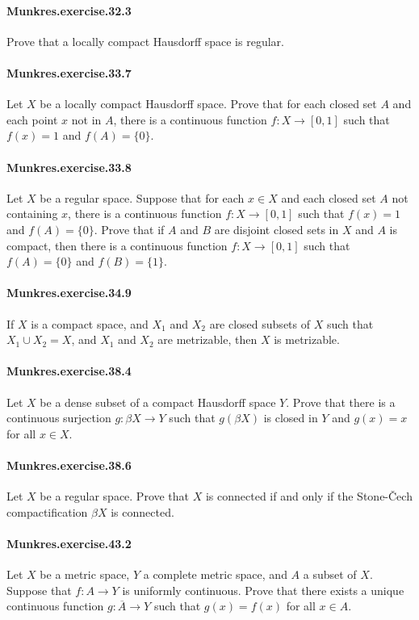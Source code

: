 \documentclass{article}
\begin{document}
\paragraph{Munkres.exercise.32.3} Prove that a locally compact Hausdorff space is regular.

\paragraph{Munkres.exercise.33.7} Let $X$ be a locally compact Hausdorff space. Prove that for each closed set $A$ and each point $x$ not in $A$, there is a continuous function $f:X\to [0,1]$ such that $f(x)=1$ and $f(A)=\{0\}$.

\paragraph{Munkres.exercise.33.8} Let $X$ be a regular space. Suppose that for each $x\in X$ and each closed set $A$ not containing $x$, there is a continuous function $f:X\to [0,1]$ such that $f(x)=1$ and $f(A)=\{0\}$. Prove that if $A$ and $B$ are disjoint closed sets in $X$ and $A$ is compact, then there is a continuous function $f:X\to [0,1]$ such that $f(A)=\{0\}$ and $f(B)=\{1\}$.

\paragraph{Munkres.exercise.34.9} If $X$ is a compact space, and $X_1$ and $X_2$ are closed subsets of $X$ such that $X_1\cup X_2=X$, and $X_1$ and $X_2$ are metrizable, then $X$ is metrizable.

\paragraph{Munkres.exercise.38.4} Let $X$ be a dense subset of a compact Hausdorff space $Y$. Prove that there is a continuous surjection $g:\beta X\to Y$ such that $g(\beta X)$ is closed in $Y$ and $g(x)=x$ for all $x\in X$.

\paragraph{Munkres.exercise.38.6} Let $X$ be a regular space. Prove that $X$ is connected if and only if the Stone-Čech compactification $\beta X$ is connected.

\paragraph{Munkres.exercise.43.2} Let $X$ be a metric space, $Y$ a complete metric space, and $A$ a subset of $X$. Suppose that $f:A\to Y$ is uniformly continuous. Prove that there exists a unique continuous function $g:\overline{A}\to Y$ such that $g(x)=f(x)$ for all $x\in A$.
\end{document}
